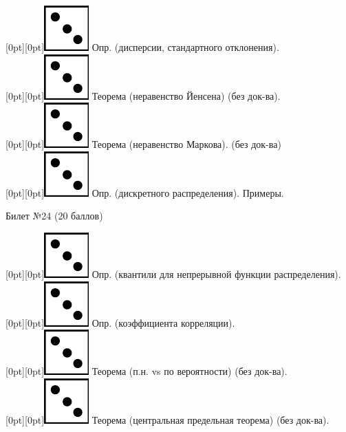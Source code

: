 \documentclass[10pt]{article}
\begin{document}
\raisebox{-1pt}[0pt][0pt]{\includegraphics[width=0.02\linewidth]{3.png}} Опр. (дисперсии, стандартного отклонения). \\ 

\raisebox{-1pt}[0pt][0pt]{\includegraphics[width=0.02\linewidth]{3.png}} Теорема (неравенство Йенсена) (без док-ва). \\

\raisebox{-1pt}[0pt][0pt]{\includegraphics[width=0.02\linewidth]{3.png}} Теорема (неравенство Маркова). (без док-ва) \\

\raisebox{-1pt}[0pt][0pt]{\includegraphics[width=0.02\linewidth]{3.png}} Опр. (дискретного распределения). Примеры. \\

\begin{center} {\Large Билет №24 (20 баллов)} \end{center}

\raisebox{-1pt}[0pt][0pt]{\includegraphics[width=0.02\linewidth]{3.png}}   Опр. (квантили для непрерывной функции распределения). \\

\raisebox{-1pt}[0pt][0pt]{\includegraphics[width=0.02\linewidth]{3.png}} Опр. (коэффициента корреляции). \\

\raisebox{-1pt}[0pt][0pt]{\includegraphics[width=0.02\linewidth]{3.png}} Теорема (п.н. vs по вероятности)  (без док-ва). \\

\raisebox{-1pt}[0pt][0pt]{\includegraphics[width=0.02\linewidth]{3.png}} Теорема (центральная предельная теорема) (без док-ва). \\
\end{document}
